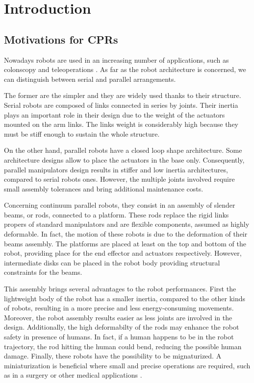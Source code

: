 \documentclass{thesisreport}
\begin{document}
 
 \chapter*{Introduction}
 \section{Motivations for CPRs}
  Nowadays robots are used in an increasing number of applications, such as colonscopy \cite{black_modeling_2017} and teleoperations \cite{till_efficient_2015}.
 As far as the robot architecture is concerned, we can distinguish between serial and parallel arrangements.
 
 The former are the simpler and they are widely used thanks to their structure. Serial robots are composed of links connected in series by joints. Their inertia plays an important role in their design due to the weight of the actuators mounted on the arm links. The links weight is considerably high because they must be stiff enough to sustain the whole structure.

 On the other hand, parallel robots have a closed loop shape architecture. Some architecture designs allow to place the actuators in the base only. Consequently, parallel manipulators design results in stiffer and low inertia architectures, compared to serial robots ones. However, the multiple joints involved require small assembly tolerances and bring additional maintenance costs.
 
 Concerning continuum parallel robots, they consist in an assembly of slender beams, or rods, connected to a platform. These rods replace the rigid links propers of standard manipulators and are flexible components, assumed as highly deformable. In fact, the motion of these robots is due to the deformation of their beams assembly.
 The platforms are placed at least on the top and bottom of the robot, providing place for the end effector and actuators respectively. However, intermediate disks can be placed in the robot body providing structural constraints for the beams.  
 
 This assembly brings several advantages to the robot performances. First the lightweight body of the robot has a smaller inertia, compared to the other kinds of robots, resulting in a more precise and less energy-consuming movements. Moreover, the robot assembly results easier as less joints are involved in the design. Additionally, the high deformabilty of the rods may enhance the robot safety in presence of humans. In fact, if a human happens to be in the robot trajectory, the rod hitting the human could bend, reducing the possible human damage. Finally, these robots have the possibility to be mignaturized. A miniaturization is beneficial where small and precise operations are required, such as in a surgery or other medical applications \cite{black_modeling_2017}. 
 
\end{document}

